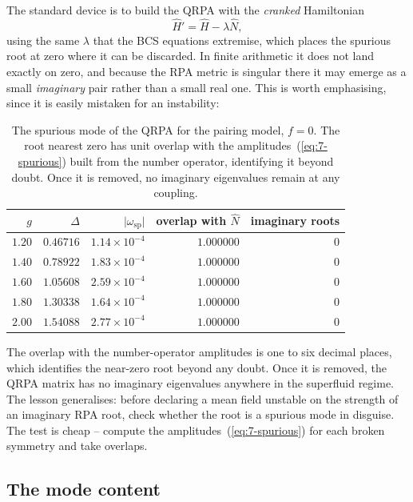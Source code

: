 The standard device is to build the QRPA with the \emph{cranked} Hamiltonian
\begin{equation}
  \hat{H}' = \hat{H} - \lambda\hat{N},
  \label{eq:7-cranked}
\end{equation}
using the same $\lambda$ that the BCS equations extremise, which places the
spurious root at zero where it can be discarded.  In finite arithmetic it does
not land exactly on zero, and because the RPA metric is singular there it may
emerge as a small \emph{imaginary} pair rather than a small real one.  This is
worth emphasising, since it is easily mistaken for an instability:

\begin{table}[h]
\centering
\renewcommand{\arraystretch}{1.25}
\setlength{\tabcolsep}{11pt}
\begin{tabular}{rrrrr}
\toprule
$g$ & $\Delta$ & $\vert\omega_{\mathrm{sp}}\vert$
  & overlap with $\hat{N}$ & imaginary roots\\
\midrule
$1.20$ & $0.46716$ & $1.14\times10^{-4}$ & $1.000000$ & $0$\\
$1.40$ & $0.78922$ & $1.83\times10^{-4}$ & $1.000000$ & $0$\\
$1.60$ & $1.05608$ & $2.59\times10^{-4}$ & $1.000000$ & $0$\\
$1.80$ & $1.30338$ & $1.64\times10^{-4}$ & $1.000000$ & $0$\\
$2.00$ & $1.54088$ & $2.77\times10^{-4}$ & $1.000000$ & $0$\\
\bottomrule
\end{tabular}
\caption{The spurious mode of the QRPA for the pairing model, $f=0$.  The
root nearest zero has unit overlap with the amplitudes~(\ref{eq:7-spurious})
built from the number operator, identifying it beyond doubt.  Once it is
removed, no imaginary eigenvalues remain at any coupling.}
\label{tab:spurious}
\end{table}

The overlap with the number-operator amplitudes is one to six decimal places,
which identifies the near-zero root beyond any doubt.  Once it is removed, the
QRPA matrix has no imaginary eigenvalues anywhere in the superfluid regime.
The lesson generalises: before declaring a mean field unstable on the strength
of an imaginary RPA root, check whether the root is a spurious mode in
disguise.  The test is cheap -- compute the amplitudes~(\ref{eq:7-spurious})
for each broken symmetry and take overlaps.

\subsection{The mode content}
\label{sec:modecontent}

